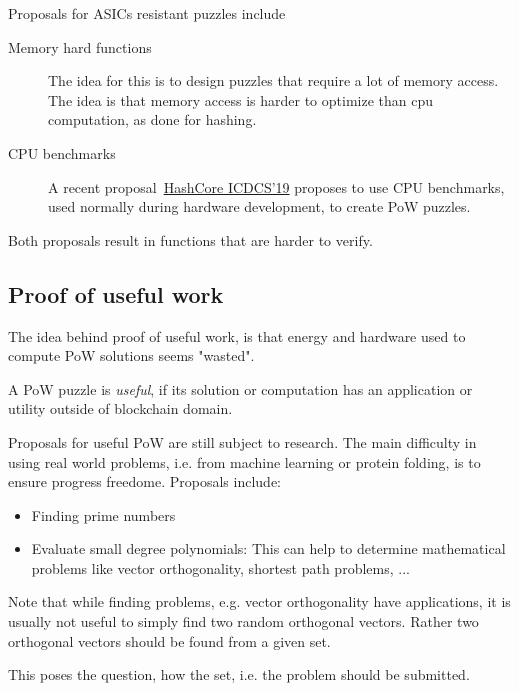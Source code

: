 \begin{note}
	Proposals for ASICs resistant puzzles include
	\begin{description}
		\item[Memory hard functions] The idea for this is to design puzzles that require a lot of memory access. The idea is that memory access is harder to optimize than cpu computation, as done for hashing.
		\item[CPU benchmarks] A recent proposal~\href{https://conferences.computer.org/icdcs/2019/pdfs/ICDCS2019-49XpIlu3rRtYi2T0qVYnNX/7v1qCHBMZ7kt9TX7Q7GlHe/6ND9kaBwjCCoPVJQvvyQ81.pdf}{HashCore ICDCS'19} proposes to use CPU benchmarks, used normally during hardware development, to create PoW puzzles.
	\end{description}
Both proposals result in functions that are harder to verify.
\end{note}

\subsection{Proof of useful work}
The idea behind proof of useful work, is that energy and hardware used to compute PoW solutions seems "wasted".

\begin{definition} A PoW puzzle is \emph{useful}, if its solution or computation has an application or utility outside of blockchain domain.
\end{definition}

\begin{note} Proposals for useful PoW are still subject to research. The main difficulty in using real world problems, i.e. from machine learning or protein folding, is to ensure progress freedome.
Proposals include:
	\begin{itemize}
		\item Finding prime numbers
		\item Evaluate small degree polynomials: This can help to determine mathematical problems like vector orthogonality, shortest path problems, ...
	\end{itemize}

Note that while finding problems, e.g. vector orthogonality have applications, it is usually not useful to simply find two random orthogonal vectors. Rather two orthogonal vectors should be found from a given set. 

This poses the question, how the set, i.e. the problem should be submitted.
\end{note}


